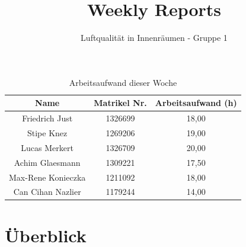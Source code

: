 \documentclass[]{article}
\title{Weekly Reports}
\author{Luftqualität in Innenräumen - Gruppe 1}
\begin{document}
\maketitle

\begin{table}[h!]
	\centering
	\begin{tabular}{|c|c|c|}
		\hline
		{\textbf{Name}}				&		{\textbf{Matrikel Nr.}} & {\textbf{Arbeitsaufwand (h)}} \\
		\hline
		Friedrich Just				&		1326699 				&		18,00\\
		\hline
		Stipe Knez					&		1269206 				&	19,00	\\
		\hline
		Lucas Merkert				&		1326709					&	20,00	\\
		\hline
		Achim Glaesmann				&		1309221					&	17,50	\\
		\hline
		Max-Rene Konieczka			&		1211092					&	18,00	\\
		\hline
		Can Cihan Nazlier			&		1179244					&	14,00	\\
		\hline
	\end{tabular}
	\caption{Arbeitsaufwand dieser Woche}
	\label{tab:worakload}
\end{table}



\section{Überblick}
\end{document}
